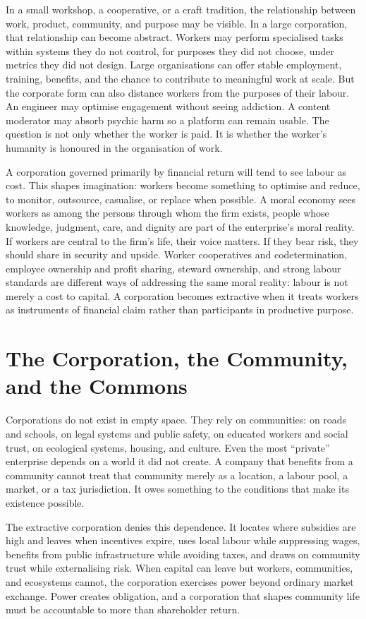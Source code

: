 \documentclass[11pt,a4paper,oneside]{book}
\begin{document}
In a small workshop, a cooperative, or a craft tradition, the relationship between work, product, community, and purpose may be visible. In a large corporation, that relationship can become abstract. Workers may perform specialised tasks within systems they do not control, for purposes they did not choose, under metrics they did not design. Large organisations can offer stable employment, training, benefits, and the chance to contribute to meaningful work at scale. But the corporate form can also distance workers from the purposes of their labour. An engineer may optimise engagement without seeing addiction. A content moderator may absorb psychic harm so a platform can remain usable. The question is not only whether the worker is paid. It is whether the worker's humanity is honoured in the organisation of work.

A corporation governed primarily by financial return will tend to see labour as cost. This shapes imagination: workers become something to optimise and reduce, to monitor, outsource, casualise, or replace when possible. A moral economy sees workers as among the persons through whom the firm exists, people whose knowledge, judgment, care, and dignity are part of the enterprise's moral reality. If workers are central to the firm's life, their voice matters. If they bear risk, they should share in security and upside. Worker cooperatives and codetermination, employee ownership and profit sharing, steward ownership, and strong labour standards are different ways of addressing the same moral reality: labour is not merely a cost to capital. A corporation becomes extractive when it treats workers as instruments of financial claim rather than participants in productive purpose.

\section*{The Corporation, the Community, and the Commons}

Corporations do not exist in empty space. They rely on communities: on roads and schools, on legal systems and public safety, on educated workers and social trust, on ecological systems, housing, and culture. Even the most ``private'' enterprise depends on a world it did not create. A company that benefits from a community cannot treat that community merely as a location, a labour pool, a market, or a tax jurisdiction. It owes something to the conditions that make its existence possible.

The extractive corporation denies this dependence. It locates where subsidies are high and leaves when incentives expire, uses local labour while suppressing wages, benefits from public infrastructure while avoiding taxes, and draws on community trust while externalising risk. When capital can leave but workers, communities, and ecosystems cannot, the corporation exercises power beyond ordinary market exchange. Power creates obligation, and a corporation that shapes community life must be accountable to more than shareholder return.
\end{document}
